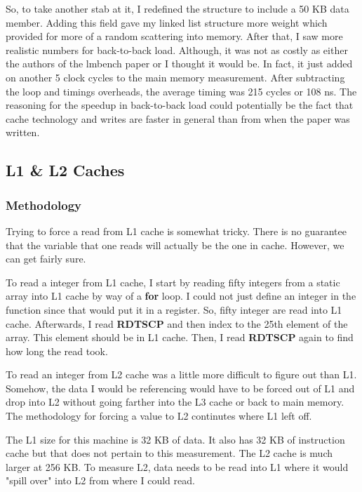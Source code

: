 \documentclass[paper=a4, fontsize=11pt]{scrartcl}
\numberwithin{equation}{section}        %
\numberwithin{figure}{section}          %
\numberwithin{table}{section}               %
\begin{document}
So, to take another stab at it, I redefined the structure to include a 50 KB data member.  Adding this field gave my linked list structure more weight which provided for more of a random scattering into memory.  After that, I saw more realistic numbers for back-to-back load.  Although, it was not as costly as either the authors of the lmbench paper or I thought it would be.  In fact, it just added on another 5 clock cycles to the main memory measurement.  After subtracting the loop and timings overheads, the average timing was 215 cycles or 108 ns.  The reasoning for the speedup in back-to-back load could potentially be the fact that cache technology and writes are faster in general than from when the paper was written.

\subsection{L1 \& L2 Caches}

\subsubsection{Methodology}

Trying to force a read from L1 cache is somewhat tricky.  There is no guarantee that the variable that one reads will actually be the one in cache.  However, we can get fairly sure.

To read a integer from L1 cache, I start by reading fifty integers from a static array into L1 cache by way of a \textbf{for} loop.  I could not just define an integer in the function since that would put it in a register.  So, fifty integer are read into L1 cache.  Afterwards, I read \textbf{RDTSCP} and then index to the 25th element of the array.  This element should be in L1 cache.  Then, I read \textbf{RDTSCP} again to find how long the read took.

To read an integer from L2 cache was a little more difficult to figure out than L1.  Somehow, the data I would be referencing would have to be forced out of L1 and drop into L2 without going farther into the L3 cache or back to main memory.  The methodology for forcing a value to L2 continutes where L1 left off.

The L1 size for this machine is 32 KB of data.  It also has 32 KB of instruction cache but that does not pertain to this measurement.  The L2 cache is much larger at 256 KB.  To measure L2, data needs to be read into L1 where it would "spill over" into L2 from where I could read.
\end{document}
